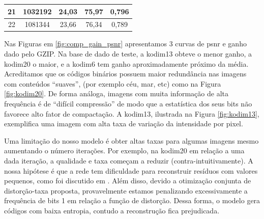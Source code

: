 \begin{table}[]
{\begin{tabular}{ccccc}
			21                & 1032192                                                                & 24,03                                                                        & 75,97                                                                             & 0,796                   \\ \hline
			22                & 1081344                                                                & 23,66                                                                        & 76,34                                                                             & 0,789                   \\ \hline
	\end{tabular}} \quad
	\label{table:entrop}
\end{table}








Nas Figuras em \ref{fig:comp_gain_psnr} apresentamos 3 curvas de \acrshort{psnr} e ganho dado pelo GZIP. Na base de dado de teste, a kodim13  obteve o menor ganho, a kodim20 o maior, e a kodim6 tem ganho aproximadamente próximo da média. 
Acreditamos que os códigos binários possuem maior redundância nas imagens com conteúdos ``suaves'', (por exemplo céu, mar, etc) como na Figura \ref{fig:kodim20}. 
De forma análoga, imagens com muita informação de alta frequência é de ``difícil compressão'' 
de modo que a estatística dos seus bits não favorece alto fator de compactação. A kodim13, ilustrada na Figura \ref{fig:kodim13}, exemplifica uma imagem com alta taxa de variação da intensidade por pixel. 

Uma limitação do nosso modelo é obter altas taxas para algumas imagens mesmo aumentando o número iterações. Por exemplo, na kodim20  em relação a uma dada iteração, a qualidade e taxa começam a reduzir (contra-intuitivamente). A nossa hipótese é que a rede tem dificuldade para reconstruir resíduos com valores pequenos, como foi discutido em \cite{FullResolution2017Toderici}.  Além disso, devido a otimização conjunta de distorção-taxa proposta, provavelmente estamos penalizando excessivamente a frequência de bits 1 em relação a função de distorção. Dessa forma, o modelo gera códigos com baixa entropia, contudo a reconstrução fica prejudicada.   


